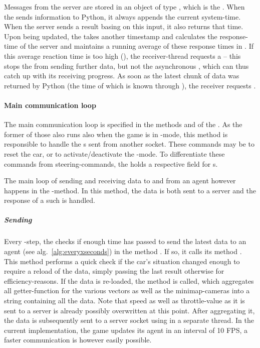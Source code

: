 Messages from the server are stored in an object of type , which is  the . When the  sends information to Python, it always appends the current system-time. When the server sends a result basing on this input, it also returns that time. Upon being updated, the  takes another timestamp and calculates the response-time of the server and maintains a running average of these response times in . If this average reaction time is too high (), the receiver-thread requests a  -- this stops the  from sending further data, but not the asynchronous , which can thus catch up with its receiving progress. As soon as the latest chunk of data was returned by Python (the time of which is known through ), the receiver requests .

\paragraph{Main communication loop} 
The main communication loop is specified in the methods  and  of the . As the former of those also runs also when the game is in -mode, this method is responsible to handle the s sent from another socket. These commands may be to reset the car, or to activate/deactivate the -mode. To differentiate these commands from steering-commands, the  holds a respective field for s.

The main loop of sending and receiving data to and from an agent however happens in the -method. In this method, the data is both sent to a server and the response of a such is handled.

\subparagraph{Sending}
Every -step, the  checks if enough time has passed to send the latest data to an agent (see alg.~\ref{alg:everyxseconds}) in the method . If so, it calls its method . This method performs a quick check if the car's situation changed enough to require a reload of the data, simply passing the last result otherwise for efficiency-reasons. If the data is re-loaded, the method  is called, which aggregates all getter-function for the various vectors as well as the minimap-cameras into a string containing all the data. Note that speed as well as throttle-value as it is sent to a server is already possibly overwritten at this point. After aggregating it, the data is subsequently sent to a server socket using  in a separate thread. In the current implementation, the game updates its agent in an interval of 10 FPS, a faster communication is however easily possible.

